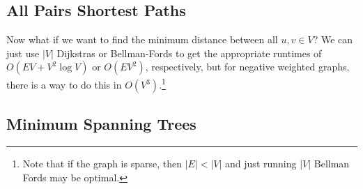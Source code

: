 \documentclass{article}
\begin{document}
  \subsection{All Pairs Shortest Paths} 

    Now what if we want to find the minimum distance between all $u, v \in V$? We can just use $|V|$ Dijkstras or Bellman-Fords to get the appropriate runtimes of $O(EV + V^2 \log{V})$ or $O(EV^2)$, respectively, but for negative weighted graphs, there is a way to do this in $O(V^3)$.\footnote{Note that if the graph is sparse, then $|E| < |V|$ and just running $|V|$ Bellman Fords may be optimal.}

  \subsection{Minimum Spanning Trees} 
\end{document}
